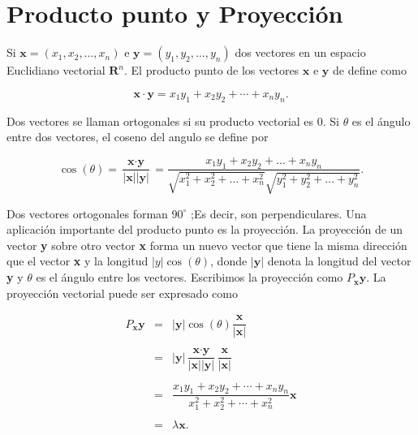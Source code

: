\section{Producto punto y Proyección}

Si $\textbf{x}=(x_1,x_2,\ldots,x_n)$ e $\textbf{y}=(y_1,y_2,\ldots, y_n)$ dos vectores en un espacio Euclidiano vectorial $\textbf{R}^n$. El producto punto de los vectores $\textbf{x}$ e $\textbf{y}$ de define como

$$\textbf{x}\cdot \textbf{y} = x_1y_1+x_2y_2+\cdots + x_ny_n.$$

Dos vectores se llaman ortogonales si su  producto vectorial es $0$. Si $\theta$ es el ángulo entre dos vectores, el coseno del angulo se define por

\begin{tcolorbox}
    \begin{equation}
	\cos(\theta)=\dfrac{\textbf{x}\cdot \textbf{y}}{|\textbf{x}||\textbf{y}|}=\dfrac{x_1y_1+x_2y_2+\ldots  +x_ny_n}{\sqrt{x_1^2+x_2^2+\ldots + x_n^2}\sqrt{y_1^2+y_2^2+\ldots + y_n^2}}.
    \end{equation}
\end{tcolorbox}

Dos vectores ortogonales forman $90^\circ$ ;Es decir, son perpendiculares. Una aplicación importante del producto punto es la proyección. La proyección de un vector \textbf{y} sobre otro vector \textbf{x} forma un nuevo vector que tiene la misma dirección que el vector \textbf{x} y la longitud $|y|\cos(\theta)$, donde $|\textbf{y}|$ denota la longitud del vector \textbf{y} y $\theta$ es el ángulo entre los vectores. Escribimos la proyección como $P_{\textbf{x}}\textbf{y}$. La proyección vectorial puede ser expresado como

$$
\begin{array}{rcl}
    P_{\textbf{x}}\textbf{y} &=& |\textbf{y}|\cos(\theta)\dfrac{\textbf{x}}{|\textbf{x}|}\\\\
			     &=& |\textbf{y}|\dfrac{\textbf{x}\cdot \textbf{y}}{|\textbf{x}||\textbf{y}|}\dfrac{\textbf{x}}{|\textbf{x}|} \\\\
			     &=& \dfrac{x_1y_1+x_2y_2+\cdots + x_ny_n}{x_1^2+x_2^2+\cdots + x_n^2}\textbf{x}\\\\
			     &=& \lambda \textbf{x}.\\\\
\end{array}
$$

